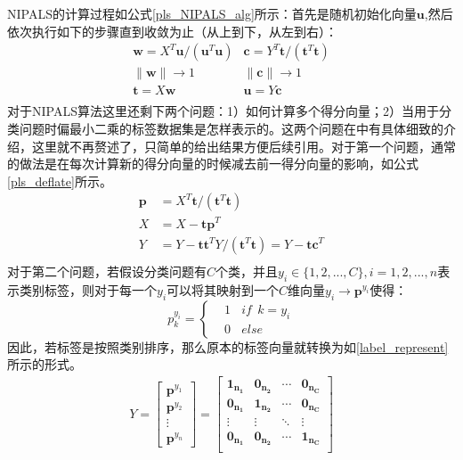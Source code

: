 NIPALS的计算过程如公式\ref{pls_NIPALS_alg}所示：首先是随机初始化向量$\bm{u}$,然后依次执行如下的步骤直到收敛为止（从上到下，从左到右）：
\begin{equation}
\label{pls_NIPALS_alg}
\begin{array}{cc}
\bm{w}={X^{T}\bm{u}/(\bm{u}^{T}\bm{u})} &\bm{c}={Y^{T}\bm{t}/(\bm{t}^{T}\bm{t})}\\
\|\bm{w}\|\rightarrow 1 &\|\bm{c}\|\rightarrow 1\\
\bm{t}=X\bm{w} &\bm{u}=Y\bm{c}\\
\end{array}
\end{equation}
对于NIPALS算法这里还剩下两个问题：1）如何计算多个得分向量；2）当用于分类问题时偏最小二乘的标签数据集是怎样表示的。这两个问题在\cite{pls_PLSALL}中有具体细致的介绍，这里就不再赘述了，只简单的给出结果方便后续引用。对于第一个问题，通常的做法是在每次计算新的得分向量的时候减去前一得分向量的影响，如公式\ref{pls_deflate}所示。
\begin{equation}
\label{pls_deflate}
\begin{split}
\bm{p}&=X^{T}\bm{t}/(\bm{t}^{T}\bm{t})\\
X&=X-\bm{tp}^{T}\\
Y&=Y-\bm{tt}^{T}Y/(\bm{t}^{T}\bm{t})=Y-\bm{tc}^{T}\\
\end{split}
\end{equation}
对于第二个问题，若假设分类问题有$C$个类，并且$y_i \in \{1,2,...,C\},i=1,2,...,n$表示类别标签，则对于每一个$y_i$可以将其映射到一个$C$维向量$y_i \rightarrow \bm{p}^{y_i}$使得：
\begin{displaymath}
p^{y_i}_{k}=\left\{
\begin{aligned}
&1~~~~if~~k=y_i\\
&0~~~~else
\end{aligned}
\right.
\end{displaymath}
因此，若标签是按照类别排序，那么原本的标签向量就转换为如\ref{label_represent}所示的形式。
\begin{equation}
\label{label_represent}
\begin{split}
{Y}=\left[
\begin{array}{c}
\bm{p}^{y_1}\\
\bm{p}^{y_2}\\
\vdots\\
\bm{p}^{y_n}
\end{array}
\right]=\left[
\begin{array}{cccc}
\bm{1_{n_1}}&\bm{0_{n_2}}&\cdots&\bm{0_{n_C}}\\
\bm{0_{n_1}}&\bm{1_{n_2}}&\cdots&\bm{0_{n_C}}\\
\vdots&\vdots&\ddots&\vdots\\
\bm{0_{n_1}}&\bm{0_{n_2}}&\cdots&\bm{1_{n_C}}\\
\end{array}
\right]
\end{split}
\end{equation}
